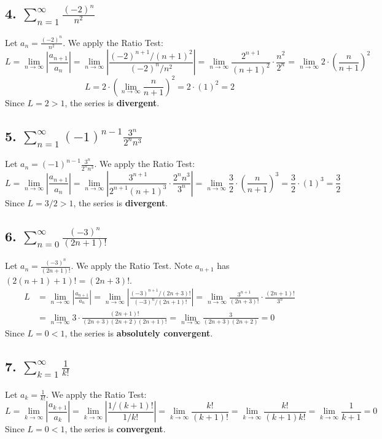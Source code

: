 \documentclass{article}
\begin{document}
\subsection*{4. $\sum_{n=1}^{\infty} \frac{(-2)^n}{n^2}$}
Let $a_n = \frac{(-2)^n}{n^2}$. We apply the Ratio Test:
\[ L = \lim_{n \to \infty} \left| \frac{a_{n+1}}{a_n} \right| = \lim_{n \to \infty} \left| \frac{(-2)^{n+1}/(n+1)^2}{(-2)^n/n^2} \right| = \lim_{n \to \infty} \frac{2^{n+1}}{(n+1)^2} \cdot \frac{n^2}{2^n} = \lim_{n \to \infty} 2 \cdot \left(\frac{n}{n+1}\right)^2 \]
\[ L = 2 \cdot \left(\lim_{n \to \infty} \frac{n}{n+1}\right)^2 = 2 \cdot (1)^2 = 2 \]
Since $L = 2 > 1$, the series is \textbf{divergent}.

\subsection*{5. $\sum_{n=1}^{\infty} (-1)^{n-1} \frac{3^n}{2^n n^3}$}
Let $a_n = (-1)^{n-1} \frac{3^n}{2^n n^3}$. We apply the Ratio Test:
\[ L = \lim_{n \to \infty} \left| \frac{a_{n+1}}{a_n} \right| = \lim_{n \to \infty} \left| \frac{3^{n+1}}{2^{n+1}(n+1)^3} \cdot \frac{2^n n^3}{3^n} \right| = \lim_{n \to \infty} \frac{3}{2} \cdot \left(\frac{n}{n+1}\right)^3 = \frac{3}{2} \cdot (1)^3 = \frac{3}{2} \]
Since $L = 3/2 > 1$, the series is \textbf{divergent}.

\subsection*{6. $\sum_{n=0}^{\infty} \frac{(-3)^n}{(2n+1)!}$}
Let $a_n = \frac{(-3)^n}{(2n+1)!}$. We apply the Ratio Test. Note $a_{n+1}$ has $(2(n+1)+1)! = (2n+3)!$.
\begin{align*}
L &= \lim_{n \to \infty} \left| \frac{a_{n+1}}{a_n} \right| = \lim_{n \to \infty} \left| \frac{(-3)^{n+1}/(2n+3)!}{(-3)^n/(2n+1)!} \right| = \lim_{n \to \infty} \frac{3^{n+1}}{(2n+3)!} \cdot \frac{(2n+1)!}{3^n} \\
&= \lim_{n \to \infty} 3 \cdot \frac{(2n+1)!}{(2n+3)(2n+2)(2n+1)!} = \lim_{n \to \infty} \frac{3}{(2n+3)(2n+2)} = 0
\end{align*}
Since $L = 0 < 1$, the series is \textbf{absolutely convergent}.

\subsection*{7. $\sum_{k=1}^{\infty} \frac{1}{k!}$}
Let $a_k = \frac{1}{k!}$. We apply the Ratio Test:
\[ L = \lim_{k \to \infty} \left| \frac{a_{k+1}}{a_k} \right| = \lim_{k \to \infty} \left| \frac{1/(k+1)!}{1/k!} \right| = \lim_{k \to \infty} \frac{k!}{(k+1)!} = \lim_{k \to \infty} \frac{k!}{(k+1)k!} = \lim_{k \to \infty} \frac{1}{k+1} = 0 \]
Since $L = 0 < 1$, the series is \textbf{convergent}.
\end{document}
